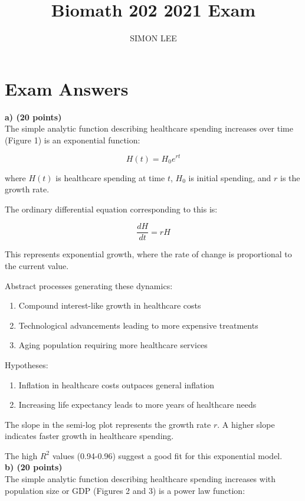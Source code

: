 \documentclass{article}
\title{Biomath 202 2021 Exam}
\author{SIMON LEE}
\date{}
\begin{document}
\maketitle

\section{Exam Answers}

\textbf{a) (20 points)}\\

The simple analytic function describing healthcare spending increases over time (Figure 1) is an exponential function:

$$H(t) = H_0 e^{rt}$$

where $H(t)$ is healthcare spending at time $t$, $H_0$ is initial spending, and $r$ is the growth rate.

The ordinary differential equation corresponding to this is:

$$\frac{dH}{dt} = rH$$

This represents exponential growth, where the rate of change is proportional to the current value.

Abstract processes generating these dynamics:
\begin{enumerate}
    \item Compound interest-like growth in healthcare costs
    \item Technological advancements leading to more expensive treatments
    \item Aging population requiring more healthcare services
\end{enumerate}

Hypotheses:
\begin{enumerate}
    \item  Inflation in healthcare costs outpaces general inflation
    \item  Increasing life expectancy leads to more years of healthcare needs
\end{enumerate}

The slope in the semi-log plot represents the growth rate $r$. A higher slope indicates faster growth in healthcare spending.

The high $R^2$ values (0.94-0.96) suggest a good fit for this exponential model.\\

\textbf{b) (20 points)}\\

The simple analytic function describing healthcare spending increases with population size or GDP (Figures 2 and 3) is a power law function:
\end{document}
